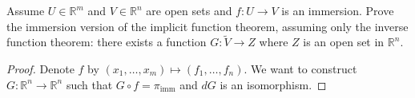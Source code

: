 \documentclass{article}
\newenvironment{problem}[2][Problem]{\begin{trivlist}
\item[\hskip \labelsep {\bfseries #1}\hskip \labelsep {\bfseries #2.}]}{\end{trivlist}}
\begin{document}
\pagebreak

\begin{problem}{2}
  Assume $U \in \mathbb{R}^m$ and $V \in \mathbb{R}^n$ are open sets and
  $f\colon U \rightarrow V$ is an immersion.
  Prove the immersion version of the implicit function theorem, assuming only
  the inverse function theorem: there exists a function $G\colon \tilde{V} \rightarrow Z$
  where $Z$ is an open set in $\mathbb{R}^n$.
\end{problem}

\begin{proof}
  Denote $f$ by $(x_1,\hdots,x_m) \mapsto (f_1,\hdots,f_n)$. We want to construct
  $G: \mathbb{R}^n \rightarrow \mathbb{R}^n$ such that $G \circ f = \pi_\text{imm}$
  and $dG$ is an isomorphism.
\end{proof}

\pagebreak

\begin{problem}{3}
\end{problem}
\end{document}
